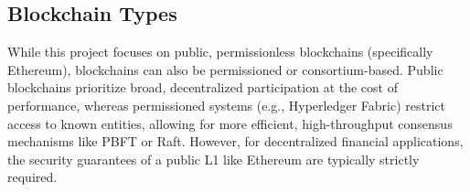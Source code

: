 \subsection{Blockchain Types}
While this project focuses on public, permissionless blockchains (specifically Ethereum), blockchains can also be permissioned or consortium-based. Public blockchains prioritize broad, decentralized participation at the cost of performance, whereas permissioned systems (e.g., Hyperledger Fabric) restrict access to known entities, allowing for more efficient, high-throughput consensus mechanisms like PBFT or Raft. However, for decentralized financial applications, the security guarantees of a public L1 like Ethereum are typically strictly required.